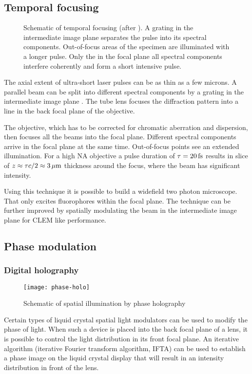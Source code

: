 \subsection{Temporal focusing}
\begin{figure}[!hbt]
  \centering
  
  \caption{Schematic of temporal focusing (after \citep{Oron2005}). A
    grating in the intermediate image plane separates the pulse into
    its spectral components. Out-of-focus areas of the specimen are
    illuminated with a longer pulse. Only the in the focal plane all
    spectral components interfere coherently and form a short
    intensive pulse.}
  \label{fig:oron}
\end{figure}
The axial extent of ultra-short laser pulses can be as thin as a few
microns. A parallel beam can be split into different spectral
components by a grating in the intermediate image plane
\citep{Oron2005}. The tube lens focuses the diffraction pattern into a
line in the back focal plane of the objective.

The objective, which has to be corrected for chromatic aberration and
dispersion, then focuses all the beams into the focal plane. Different
spectral components arrive in the focal plane at the same
time. Out-of-focus points see an extended illumination. For a high NA
objective a pulse duration of $\tau=\unit[20]{fs}$ results in slice of
$z\approx\tau c/2\approx\unit[3]{\mu m}$ thickness around the focus,
where the beam has significant intensity.

Using this technique it is possible to build a widefield two photon
microscope. That only excites fluorophores within the focal plane. The
technique can be further improved by spatially modulating the beam
in the intermediate image plane for CLEM like performance.

\subsection{Phase modulation}
\subsubsection{Digital holography}
\begin{figure}[!hbt]
  \centering
  \texttt{[image: phase-holo]} 
  \caption{Schematic of spatial illumination by phase holography
    }
  \label{fig:phase-holo}
\end{figure}
Certain types of liquid crystal spatial light modulators can be used
to modify the phase of light. When such a device is placed into the
back focal plane of a lens, it is possible to control the light
distribution in its front focal plane. An iterative algorithm
(iterative Fourier transform algorithm, IFTA) can be used to establish
a phase image on the liquid crystal display that will result in an
intensity distribution in front of the lens.

